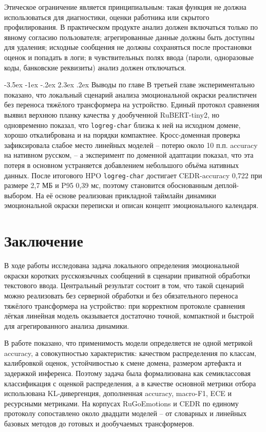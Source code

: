 \documentclass[12pt,a4paper]{report}
\makeatletter
\renewcommand{\section}{\@startsection{section}{1}{\z@}%
  {-3.5ex \@plus -1ex \@minus -.2ex}%
  {2.3ex \@plus .2ex}%
  {\normalfont\large\bfseries\centering}}
\makeatother
\begin{document}
Этическое ограничение является принципиальным: такая функция не должна использоваться для диагностики, оценки работника или скрытого профилирования. В практическом продукте анализ должен включаться только по явному согласию пользователя; агрегированные данные должны быть доступны для удаления; исходные сообщения не должны сохраняться после простановки оценок и попадать в логи; в чувствительных полях ввода (пароли, одноразовые коды, банковские реквизиты) анализ должен отключаться.

\section{Выводы по главе}
В третьей главе экспериментально показано, что локальный сценарий анализа эмоциональной окраски реалистичен без переноса тяжёлого трансформера на устройство. Единый протокол сравнения выявил верхнюю планку качества у дообученной RuBERT-tiny2, но одновременно показал, что \texttt{logreg-char} близка к ней на исходном домене, хорошо откалибрована и на порядки компактнее. Кросс-доменная проверка зафиксировала слабое место линейных моделей -- потерю около 10 п.п. accuracy на нативном русском, -- а эксперимент по доменной адаптации показал, что эта потеря в основном устраняется добавлением небольшого объёма нативных данных. После итогового HPO \texttt{logreg-char} достигает CEDR-accuracy 0{,}722 при размере 2{,}7 МБ и P95 0{,}39 мс, поэтому становится обоснованным деплой-выбором. На её основе реализован прикладной таймлайн динамики эмоциональной окраски переписки и описан концепт эмоционального календаря.

\chapter*{Заключение}
В ходе работы исследована задача локального определения эмоциональной окраски коротких русскоязычных сообщений в сценарии приватной обработки текстового ввода. Центральный результат состоит в том, что такой сценарий можно реализовать без серверной обработки и без обязательного переноса тяжёлого трансформера на устройство: при корректном протоколе сравнения лёгкая линейная модель оказывается достаточно точной, компактной и быстрой для агрегированного анализа динамики.

В работе показано, что применимость модели определяется не одной метрикой accuracy, а совокупностью характеристик: качеством распределения по классам, калибровкой оценок, устойчивостью к смене домена, размером артефакта и задержкой инференса. Поэтому задача была формализована как семиклассовая классификация с оценкой распределения, а в качестве основной метрики отбора использована KL-дивергенция, дополненная accuracy, macro-F1, ECE и ресурсными метриками. На корпусах RuGoEmotions и CEDR по единому протоколу сопоставлено около двадцати моделей -- от словарных и линейных базовых методов до готовых и дообучаемых трансформеров.
\end{document}
